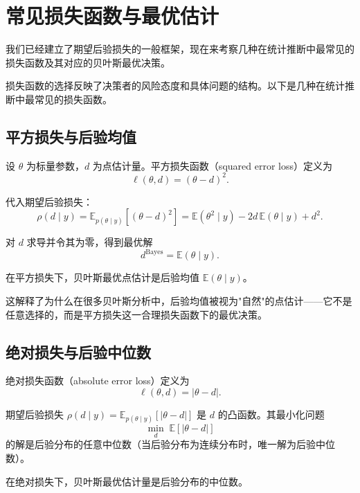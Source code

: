 \section{常见损失函数与最优估计}

我们已经建立了期望后验损失的一般框架，现在来考察几种在统计推断中最常见的损失函数及其对应的贝叶斯最优决策。

损失函数的选择反映了决策者的风险态度和具体问题的结构。以下是几种在统计推断中最常见的损失函数。

\subsection{平方损失与后验均值}

设 $\theta$ 为标量参数，$d$ 为点估计量。平方损失函数（squared error loss）定义为
\[
\ell(\theta, d) = (\theta - d)^2.
\]

代入期望后验损失：
\[
\rho(d \mid y) = \mathbb{E}_{p(\theta\mid y)}[(\theta - d)^2]
           = \mathbb{E}(\theta^2 \mid y) - 2d \, \mathbb{E}(\theta \mid y) + d^2.
\]

对 $d$ 求导并令其为零，得到最优解
\[
d^{\text{Bayes}} = \mathbb{E}(\theta \mid y).
\]

\begin{Theorem}[平方损失下的贝叶斯最优估计]\label{th:squared-loss-bayes}
  在平方损失下，贝叶斯最优点估计是后验均值 $\mathbb{E}(\theta \mid y)$。
\end{Theorem}

这解释了为什么在很多贝叶斯分析中，后验均值被视为"自然"的点估计——它不是任意选择的，而是平方损失这一合理损失函数下的最优决策。

\subsection{绝对损失与后验中位数}

绝对损失函数（absolute error loss）定义为
\[
\ell(\theta, d) = \lvert\theta - d\rvert.
\]

期望后验损失 $\rho(d \mid y) = \mathbb{E}_{p(\theta\mid y)}[\lvert\theta - d\rvert]$ 是 $d$ 的凸函数。其最小化问题
\[
\underset{d}{\min} \; \mathbb{E}[\lvert\theta - d\rvert]
\]
的解是后验分布的任意中位数（当后验分布为连续分布时，唯一解为后验中位数）。

\begin{Theorem}[绝对损失下的贝叶斯最优估计]\label{th:absolute-loss-bayes}
  在绝对损失下，贝叶斯最优估计量是后验分布的中位数。
\end{Theorem}

